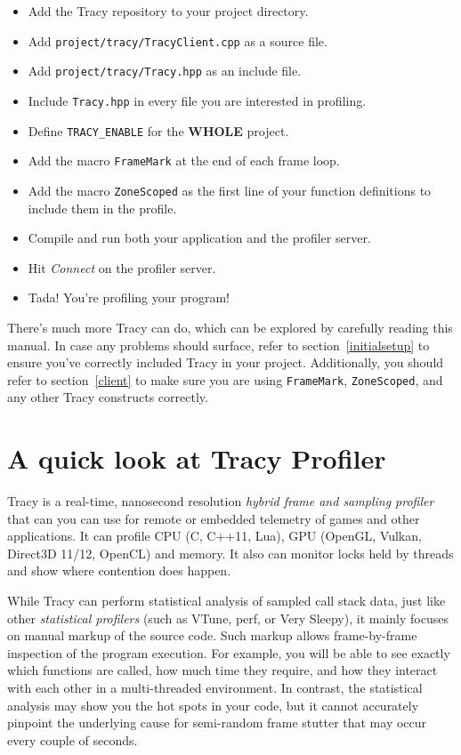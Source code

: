 \documentclass[hidelinks,titlepage,a4paper]{article}
\begin{document}
\begin{itemize}
\item Add the Tracy repository to your project directory.
\item Add \texttt{project/tracy/TracyClient.cpp} as a source file.
\item Add \texttt{project/tracy/Tracy.hpp} as an include file.
\item Include \texttt{Tracy.hpp} in every file you are interested in profiling.
\item Define \texttt{TRACY\_ENABLE} for the \textbf{WHOLE} project.
\item Add the macro \texttt{FrameMark} at the end of each frame loop.
\item Add the macro \texttt{ZoneScoped} as the first line of your function definitions to include them in the profile.
\item Compile and run both your application and the profiler server.
\item Hit \emph{Connect} on the profiler server.
\item Tada! You're profiling your program!
\end{itemize}

There's much more Tracy can do, which can be explored by carefully reading this manual. In case any problems should surface, refer to section~\ref{initialsetup} to ensure you've correctly included Tracy in your project. Additionally, you should refer to section~\ref{client} to make sure you are using \texttt{FrameMark}, \texttt{ZoneScoped}, and any other Tracy constructs correctly.

\newpage

\tableofcontents

\newpage

\section{A quick look at Tracy Profiler}
\label{quicklook}

Tracy is a real-time, nanosecond resolution \emph{hybrid frame and sampling profiler} that can you can use for remote or
embedded telemetry of games and other applications. It can profile CPU (C, C++11, Lua), GPU (OpenGL, Vulkan, Direct3D
11/12, OpenCL) and memory. It also can monitor locks held by threads and show where contention does happen.

While Tracy can perform statistical analysis of sampled call stack data, just like other \emph{statistical profilers} (such as VTune, perf, or Very Sleepy), it mainly focuses on manual markup of the source code. Such markup allows frame-by-frame inspection of the program execution. For example, you will be able to see exactly which functions are called, how much time they require, and how they interact with each other in a multi-threaded environment. In contrast, the statistical analysis may show you the hot spots in your code, but it cannot accurately pinpoint the underlying cause for semi-random frame stutter that may occur every couple of seconds.
\end{document}
